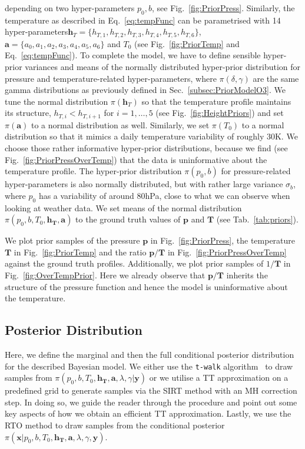 depending on two hyper-parameters $p_0,b$, see Fig.~\ref{fig:PriorPress}.
Similarly, the temperature as described in Eq.~\ref{eq:tempFunc} can be parametrised with 14 hyper-parameters\linebreak $\bm{h}_T = \{ h_{T,1}, h_{T,2},h_{T,3},h_{T,4},h_{T,5},h_{T,6} \}$, $\bm{a} = \{a_0, a_1, a_2,a_3,a_4,a_5,a_6 \} $ and $T_0$ (see Fig.~\ref{fig:PriorTemp} and Eq.~\ref{eq:tempFunc}).
To complete the model, we have to define sensible hyper-prior variances and means of the normally distributed hyper-prior distribution for pressure and temperature-related hyper-parameters, where $\pi(\delta,\gamma)$ are the same gamma distributions as previously defined in Sec.~\ref{subsec:PriorModelO3}.
We tune the normal distribution $\pi(\bm{h}_T)$ so that the temperature profile maintains its structure, $ h_{T, i} < h_{T, i+1}$ for $i = 1,\dots, 5$ (see Fig.~\ref{fig:HeightPriors}) and set $\pi(\bm{a})$ to a normal distribution as well.
Similarly, we set $\pi(T_0)$ to a normal distribution so that it mimics a daily temperature variability of roughly 30K.
We choose those rather informative hyper-prior distributions, because we find (see Fig.~\ref{fig:PriorPressOverTemp}) that the data is uninformative about the temperature profile.
The hyper-prior distribution $\pi(p_0, b)$ for pressure-related hyper-parameters is also normally distributed, but with rather large variance $\sigma_b$, where $p_0$ has a variability of around 80hPa, close to what we can observe when looking at weather data.
We set means of the normal distribution $\pi(p_0,b,T_0,\bm{h_T},\bm{a})$ to the ground truth values of $\bm{p}$ and $\bm{T}$ (see Tab.~\ref{tab:priors}).

We plot prior samples of the pressure $\bm{p}$ in Fig.~\ref{fig:PriorPress}, the temperature $\bm{T}$ in Fig.~\ref{fig:PriorTemp} and the ratio $\bm{p}/\bm{T}$ in Fig.~\ref{fig:PriorPressOverTemp} against the ground truth profiles.
Additionally, we plot prior samples of $1/\bm{T}$ in Fig.~\ref{fig:OverTempPrior}.
Here we already observe that $\bm{p}/\bm{T}$ inherits the structure of the pressure function and hence the model is uninformative about the temperature.
\clearpage

\subsection{Posterior Distribution}
Here, we define the marginal and then the full conditional posterior distribution for the described Bayesian model.
We either use the \texttt{t-walk} algorithm~\cite{christen2010general} to draw samples from $\pi(p_0,b,T_0,\bm{h_T},\bm{a} ,\lambda, \gamma| \bm{y})$ or we utilise a TT approximation on a predefined grid to generate samples via the SIRT method with an MH correction step.
In doing so, we guide the reader through the procedure and point out some key aspects of how we obtain an efficient TT approximation.
Lastly, we use the RTO method to draw samples from the conditional posterior $\pi(\bm{x}|p_0,b,T_0,\bm{h_T},\bm{a} ,\lambda, \gamma, \bm{y})$.

